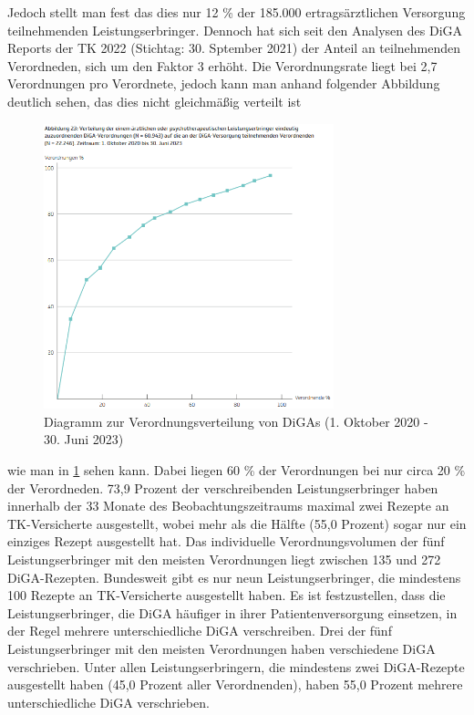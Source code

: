 \documentclass{article}
\begin{document}
			Jedoch stellt man fest das dies nur 12 \% der 185.000 ertragsärztlichen Versorgung teilnehmenden Leistungserbringer. Dennoch hat sich seit den Analysen des DiGA Reports der TK 2022 (Stichtag: 30. Sptember 2021) der Anteil an teilnehmenden Verordneden, sich um den Faktor 3 erhöht. Die Verordnungsrate liegt bei 2,7 Verordnungen pro Verordnete, jedoch kann man anhand folgender Abbildung deutlich sehen, das dies nicht gleichmäßig verteilt ist
			\begin{figure}[hbtp]
				\centering
				\includegraphics[width=0.75\textwidth]{./grafiken/abbildung_verordnungen_pro_verordneten_diga}
				\caption[Verordnungsverteilung (1. Oktober 2020 - 30. Juni 2023)]{Diagramm zur Verordnungsverteilung von DiGAs (1. Oktober 2020 - 30. Juni 2023)}
				\label{Abb-verordnungen-diga}
			\end{figure}
			wie man in \ref{Abb-verordnungen-diga} sehen kann. Dabei liegen 60 \% der Verordnungen bei nur circa 20 \% der Verordneden. 73,9 Prozent der verschreibenden Leistungserbringer haben innerhalb der 33 Monate des Beobachtungszeitraums maximal zwei Rezepte an TK-Versicherte ausgestellt, wobei mehr als die Hälfte (55,0 Prozent) sogar nur ein einziges Rezept ausgestellt hat. Das individuelle Verordnungsvolumen der fünf Leistungserbringer mit den meisten Verordnungen liegt zwischen 135 und 272 DiGA-Rezepten. Bundesweit gibt es nur neun Leistungserbringer, die mindestens 100 Rezepte an TK-Versicherte ausgestellt haben. Es ist festzustellen, dass die Leistungserbringer, die DiGA häufiger in ihrer Patientenversorgung einsetzen, in der Regel mehrere unterschiedliche DiGA verschreiben. Drei der fünf Leistungserbringer mit den meisten Verordnungen haben verschiedene DiGA verschrieben. Unter allen Leistungserbringern, die mindestens zwei DiGA-Rezepte ausgestellt haben (45,0 Prozent aller Verordnenden), haben 55,0 Prozent mehrere unterschiedliche DiGA verschrieben. \cite[vgl. S. 28]{TK-Report-2}
			
\end{document}
